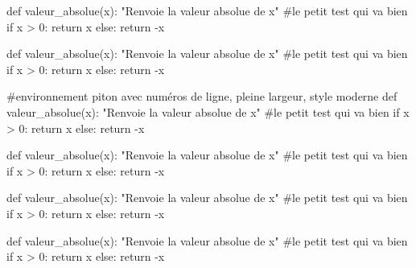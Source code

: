 \documentclass[french,a4paper,10pt]{article}
\begin{document}
\pagebreak

{\small \begin{codehigh}
\begin{CodePiton}[Style=Classique,Largeur=10cm,BarreTitre=false,Alignement=center]{}
def valeur_absolue(x):
    "Renvoie la valeur absolue de x"
    #le petit test qui va bien
    if x > 0:
        return x
    else:
    return -x
\end{CodePiton}
\end{codehigh}}

\begin{CodePiton}[Style=Classique,Largeur=10cm,BarreTitre=false,Alignement=center]{}
def valeur_absolue(x):
	"Renvoie la valeur absolue de x"
	#le petit test qui va bien
	if x > 0:
		return x
	else:
		return -x
\end{CodePiton}

{\small \begin{codehigh}
\begin{CodePiton}%
    [Style=Classique,Largeur=0.5\linewidth,Cadre=false,Alignement=flush right,Filigrane,Titre={Script}]{}
#environnement piton avec numéros de ligne, pleine largeur, style moderne
def valeur_absolue(x):
    "Renvoie la valeur absolue de x"
    #le petit test qui va bien
    if x > 0:
        return x
    else:
    return -x
\end{CodePiton}
\end{codehigh}}

\begin{CodePiton}[Style=Classique,Largeur=0.5\linewidth,Cadre=false,Alignement=flush right,Filigrane,Titre={Script}]{}
def valeur_absolue(x):
	"Renvoie la valeur absolue de x"
	#le petit test qui va bien
	if x > 0:
		return x
	else:
		return -x
\end{CodePiton}

{\small \begin{codehigh}
\begin{CodePiton}[Largeur=11cm,Filigrane,Alignement=flush left,Lignes=false]{}
def valeur_absolue(x):
    "Renvoie la valeur absolue de x"
    #le petit test qui va bien
    if x > 0:
        return x
    else:
    return -x
\end{CodePiton}
\end{codehigh}}

\begin{CodePiton}[Largeur=11cm,Filigrane,Alignement=flush left,Lignes=false]{}
def valeur_absolue(x):
	"Renvoie la valeur absolue de x"
	#le petit test qui va bien
	if x > 0:
		return x
	else:
		return -x
\end{CodePiton}
\end{document}
